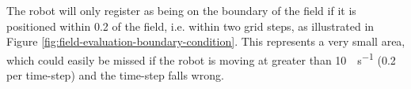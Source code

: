\documentclass[10pt]{article}
\begin{document}
The robot will only register as being on the boundary of the field if it is
positioned within \SI{0.2}{\inch} of the field, i.e. within two grid steps, as
illustrated in Figure \ref{fig:field-evaluation-boundary-condition}.  This
represents a very small area, which could easily be missed if the robot is
moving at greater than \SI{10}{\inch\per\second} (\SI{0.2}{\inch} per time-step)
and the time-step falls wrong.

\begin{figure}
  \centering

\end{figure}
\end{document}

